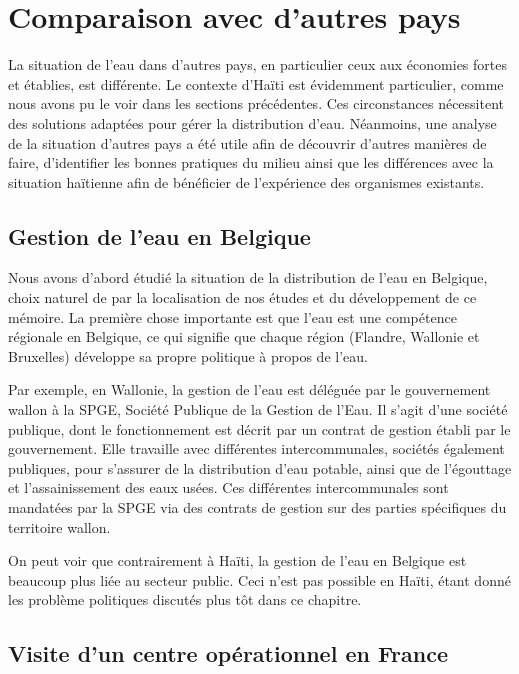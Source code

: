 \documentclass{EPL-master-thesis-covers-FR}
\begin{document}
		\section{Comparaison avec d'autres pays}

			La situation de l'eau dans d'autres pays, en particulier ceux aux économies fortes et établies, est différente. Le contexte d'Haïti est évidemment particulier, comme nous avons pu le voir dans les sections précédentes. Ces circonstances nécessitent des solutions adaptées pour gérer la distribution d'eau. Néanmoins, une analyse de la situation d'autres pays a été utile afin de découvrir d'autres manières de faire, d'identifier les bonnes pratiques du milieu ainsi que les différences avec la situation haïtienne afin de bénéficier de l'expérience des organismes existants.

			\subsection*{Gestion de l'eau en Belgique}

				Nous avons d'abord étudié la situation de la distribution de l'eau en Belgique, choix naturel de par la localisation de nos études et du développement de ce mémoire. La première chose importante est que l'eau est une compétence régionale en Belgique, ce qui signifie que chaque région (Flandre, Wallonie et Bruxelles) développe sa propre politique à propos de l'eau.

				Par exemple, en Wallonie, la gestion de l'eau est déléguée par le gouvernement wallon à la SPGE, Société Publique de la Gestion de l'Eau. Il s'agit d'une société publique, dont le fonctionnement est décrit par un contrat de gestion établi par le gouvernement. Elle travaille avec différentes intercommunales, sociétés également publiques, pour s'assurer de la distribution d'eau potable, ainsi que de l'égouttage et l'assainissement des eaux usées. Ces différentes intercommunales sont mandatées par la SPGE via des contrats de gestion sur des parties spécifiques du territoire wallon.


				On peut voir que contrairement à Haïti, la gestion de l'eau en Belgique est beaucoup plus liée au secteur public. Ceci n'est pas possible en Haïti, étant donné les problème politiques discutés plus tôt dans ce chapitre.

			\subsection*{Visite d'un centre opérationnel en France}
\end{document}
